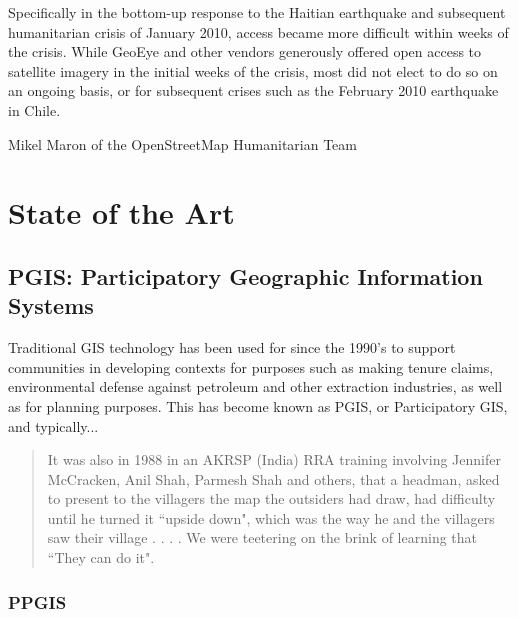 \documentclass[11pt]{report}
\begin{document}
Specifically in the bottom-up response to the Haitian earthquake and subsequent humanitarian crisis of January 2010, access became more difficult within weeks of the crisis. While GeoEye and other vendors generously offered open access to satellite imagery in the initial weeks of the crisis, most did not elect to do so on an ongoing basis, or for subsequent crises such as the February 2010 earthquake in Chile.





Mikel Maron of the OpenStreetMap Humanitarian Team 


\chapter{State of the Art}
\section{PGIS: Participatory Geographic Information Systems}

Traditional GIS technology has been used for since the 1990's to support communities in developing contexts for purposes such as making tenure claims, environmental defense against petroleum and other extraction industries, as well as for planning purposes. This has become known as PGIS, or Participatory GIS, and typically... 

\begin{quote}
It was also in 1988 in an AKRSP (India) RRA training involving Jennifer McCracken, Anil Shah, Parmesh Shah and others, that a headman, asked to present to the villagers the map the outsiders had draw, had difficulty until he turned it ``upside down", which was the way he and the villagers saw their village . . . . We were teetering on the brink of learning that ``They can do it".
\cite{chambers2006participatory}
\end{quote}


\subsection{PPGIS}
\end{document}
